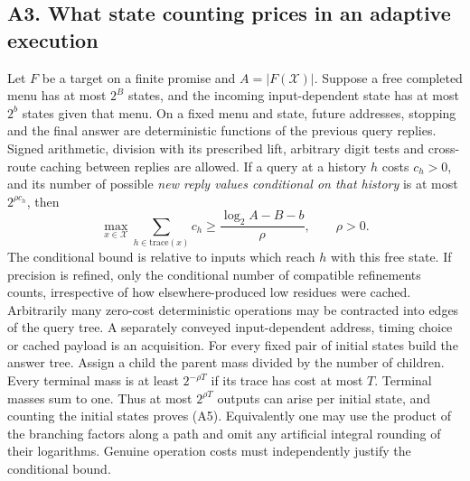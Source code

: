 \documentclass[11pt,a4paper]{article}
\begin{document}
\subsection{A3. What state counting prices in an adaptive
execution}\label{v9-a3-what-state-counting-prices-in-an-adaptive-execution}

Let \(F\) be a target on a finite promise and \(A=|F(\mathcal X)|\).
Suppose a free completed menu has at most \(2^B\) states, and the
incoming input-dependent state has at most \(2^b\) states given that
menu. On a fixed menu and state, future addresses, stopping and the
final answer are deterministic functions of the previous query replies.
Signed arithmetic, division with its prescribed lift, arbitrary digit
tests and cross-route caching between replies are allowed. If a query at
a history \(h\) costs \(c_h>0\), and its number of possible \emph{new
reply values conditional on that history} is at most \(2^{\rho c_h}\),
then \[
             \max_{x\in\mathcal X}\sum_{h\in\mathrm{trace}(x)}c_h
             \ge \frac{\log_2 A-B-b}{\rho},\qquad \rho>0.
\tag{A5}
\] The conditional bound is relative to inputs which reach \(h\) with
this free state. If precision is refined, only the conditional number of
compatible refinements counts, irrespective of how elsewhere-produced
low residues were cached. Arbitrarily many zero-cost deterministic
operations may be contracted into edges of the query tree. A separately
conveyed input-dependent address, timing choice or cached payload is an
acquisition. For every fixed pair of initial states build the answer
tree. Assign a child the parent mass divided by the number of children.
Every terminal mass is at least \(2^{-\rho T}\) if its trace has cost at
most \(T\). Terminal masses sum to one. Thus at most \(2^{\rho T}\)
outputs can arise per initial state, and counting the initial states
proves (A5). Equivalently one may use the product of the branching
factors along a path and omit any artificial integral rounding of their
logarithms. Genuine operation costs must independently justify the
conditional bound.
\end{document}
